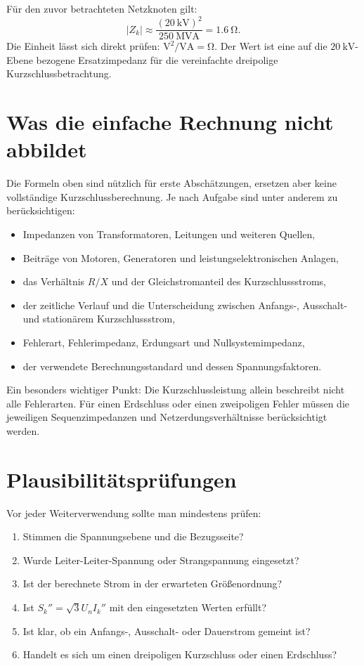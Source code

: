 \begin{rechenbeispiel}
Für den zuvor betrachteten Netzknoten gilt:
\[
|Z_k|\approx
\frac{(\SI{20}{\kilo\volt})^2}{\SI{250}{\mega\volt\ampere}}
=\SI{1.6}{\ohm}.
\]
Die Einheit lässt sich direkt prüfen:
\(\si{\volt\squared}/\si{\volt\ampere}=\si{\ohm}\).
Der Wert ist eine auf die \(\SI{20}{\kilo\volt}\)-Ebene bezogene
Ersatzimpedanz für die vereinfachte dreipolige Kurzschlussbetrachtung.
\end{rechenbeispiel}

\section{Was die einfache Rechnung nicht abbildet}

Die Formeln oben sind nützlich für erste Abschätzungen, ersetzen aber keine
vollständige Kurzschlussberechnung. Je nach Aufgabe sind unter anderem zu
berücksichtigen:
\begin{itemize}
  \item Impedanzen von Transformatoren, Leitungen und weiteren Quellen,
  \item Beiträge von Motoren, Generatoren und leistungselektronischen Anlagen,
  \item das Verhältnis \(R/X\) und der Gleichstromanteil des Kurzschlussstroms,
  \item der zeitliche Verlauf und die Unterscheidung zwischen Anfangs-,
        Ausschalt- und stationärem Kurzschlussstrom,
  \item Fehlerart, Fehlerimpedanz, Erdungsart und Nullsystemimpedanz,
  \item der verwendete Berechnungsstandard und dessen Spannungsfaktoren.
\end{itemize}

Ein besonders wichtiger Punkt: Die Kurzschlussleistung allein beschreibt
nicht alle Fehlerarten. Für einen Erdschluss oder einen zweipoligen Fehler
müssen die jeweiligen Sequenzimpedanzen und Netzerdungsverhältnisse
berücksichtigt werden.

\section{Plausibilitätsprüfungen}

Vor jeder Weiterverwendung sollte man mindestens prüfen:
\begin{enumerate}
  \item Stimmen die Spannungsebene und die Bezugsseite?
  \item Wurde Leiter-Leiter-Spannung oder Strangspannung eingesetzt?
  \item Ist der berechnete Strom in der erwarteten Größenordnung?
  \item Ist \(S_k''=\sqrt{3}U_nI_k''\) mit den eingesetzten Werten erfüllt?
  \item Ist klar, ob ein Anfangs-, Ausschalt- oder Dauerstrom gemeint ist?
  \item Handelt es sich um einen dreipoligen Kurzschluss oder einen Erdschluss?
\end{enumerate}


